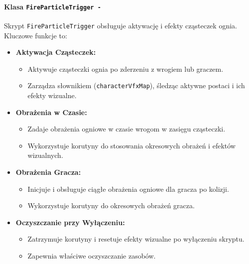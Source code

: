 \paragraph{Klasa \texttt{FireParticleTrigger -}}
Skrypt \texttt{FireParticleTrigger} obsługuje aktywację i efekty cząsteczek ognia. Kluczowe funkcje to:
\begin{itemize}
\item \textbf{Aktywacja Cząsteczek:}
    \begin{itemize}
         \item Aktywuje cząsteczki ognia po zderzeniu z wrogiem lub graczem.
         \item Zarządza słownikiem (\texttt{characterVfxMap}), śledząc aktywne postaci i ich efekty wizualne.
    \end{itemize}
\item \textbf{Obrażenia w Czasie:}
    \begin{itemize}
         \item Zadaje obrażenia ogniowe w czasie wrogom w zasięgu cząsteczki.
         \item Wykorzystuje korutyny do stosowania okresowych obrażeń i efektów wizualnych.
    \end{itemize}
\item \textbf{Obrażenia Gracza:}
    \begin{itemize}
         \item Inicjuje i obsługuje ciągłe obrażenia ogniowe dla gracza po kolizji.
         \item Wykorzystuje korutyny do okresowych obrażeń gracza.
    \end{itemize}
\item \textbf{Oczyszczanie przy Wyłączeniu:}
    \begin{itemize}
        \item Zatrzymuje korutyny i resetuje efekty wizualne po wyłączeniu skryptu.
        \item Zapewnia właściwe oczyszczanie zasobów.
    \end{itemize}
\end{itemize}

